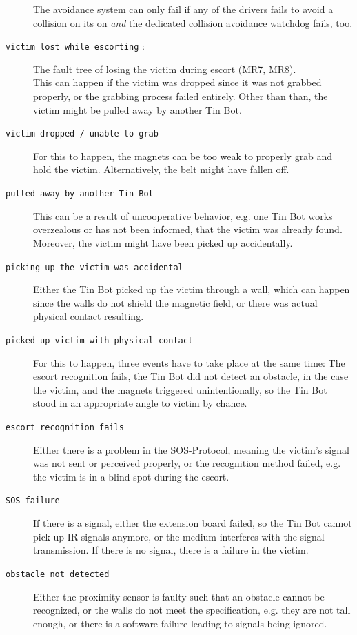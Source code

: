 \documentclass[a4paper,parskip,headheight=38pt]{scrartcl} %
\begin{document}
\begin{description}
    The avoidance system can only fail if any of the drivers fails to avoid a collision on its on \emph{and} the dedicated collision avoidance watchdog fails, too.
\item[\texttt{victim lost while escorting} \refpdf{victimlost}:]
    The fault tree of losing the victim during escort (MR7, MR8).\\
    This can happen if the victim was dropped since it was not grabbed properly, or the grabbing process failed entirely. Other than than, the victim might be pulled away by another Tin Bot.
\item[\texttt{victim dropped / unable to grab}]
    For this to happen, the magnets can be too weak to properly grab and hold the victim. Alternatively, the belt might have fallen off.
\item[\texttt{pulled away by another Tin Bot}]
    This can be a result of uncooperative behavior, e.g. one Tin Bot works overzealous or has not been informed, that the victim was already found. Moreover, the victim might have been picked up accidentally.
\item[\texttt{picking up the victim was accidental}]
    Either the Tin Bot picked up the victim through a wall, which can happen since the walls do not shield the magnetic field, or there was actual physical contact resulting.
\item[\texttt{picked up victim with physical contact}]
    For this to happen, three events have to take place at the same time: The escort recognition fails, the Tin Bot did not detect an obstacle, in the case the victim, and the magnets triggered unintentionally, so the Tin Bot stood in an appropriate angle to victim by chance.
\item[\texttt{escort recognition fails}]
    Either there is a problem in the SOS-Protocol, meaning the victim's signal was not sent or perceived properly, or the recognition method failed, e.g. the victim is in a blind spot during the escort.
\item[\texttt{SOS failure}]
    If there is a signal, either the extension board failed, so the Tin Bot cannot pick up IR signals anymore, or the medium interferes with the signal transmission. If there is no signal, there is a failure in the victim.
\item[\texttt{obstacle not detected}]
    Either the proximity sensor is faulty such that an obstacle cannot be recognized, or the walls do not meet the specification, e.g. they are not tall enough, or there is a software failure leading to signals being ignored.

\end{description}
\end{document}
